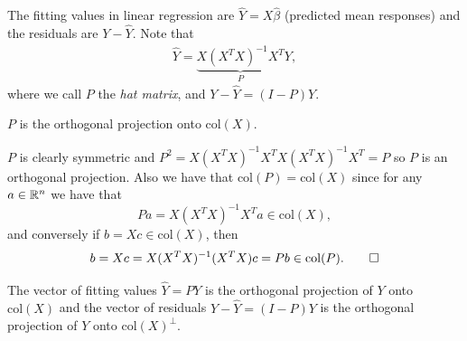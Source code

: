 \documentclass{article}
\begin{document}
The fitting values in linear regression are $ \hat Y = X\hat \beta $ (predicted mean responses) and the residuals are $ Y-\hat Y $. Note that 
\begin{align*}
	\hat Y =\underbrace{ X(X^TX)^{-1} X^T}_P Y,
\end{align*}
where we call $ P $ the \textit{hat matrix}, and $ Y-\hat Y = (I-P)Y $.
\begin{proposition}
	$ P $ is the orthogonal projection onto $ \mathrm{col}(X) $.
\end{proposition}
\pf $ P $ is clearly symmetric and $ P^2 = X(X^TX)^{-1}X^TX(X^TX)^{-1}X^T = P $ so $ P $ is an orthogonal projection. Also we have that $ \mathrm{col}(P) = \mathrm{col}(X) $ since for any $ a\in \mathbb{R}^n $ we have that
\[
	Pa =X(X^TX)^{-1}X^T a \in \mathrm{col}(X),
\]
and conversely if $ b = Xc \in \mathrm{col}(X) $, then
\[
	b = Xc = X(X^TX)^{-1}(X^TX)c = Pb \in \mathrm{col}(P).\qed
\]
\begin{corollary}
	The vector of fitting values $ \hat Y = PY $ is the orthogonal projection of $ Y $ onto $ \mathrm{col}(X) $ and the vector of residuals $ Y-\hat Y = (I-P)Y $ is the orthogonal projection of $ Y $ onto $ \mathrm{col}(X)^\perp $.
\end{corollary}
\end{document}
